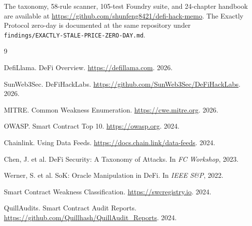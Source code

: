 \documentclass[runningheads]{llncs}
\begin{document}
The taxonomy, 58-rule scanner, 105-test Foundry suite, and 24-chapter handbook are available at \url{https://github.com/shunfeng8421/defi-hack-memo}. The Exactly Protocol zero-day is documented at the same repository under \texttt{findings/EXACTLY-STALE-PRICE-ZERO-DAY.md}.

\begin{thebibliography}{9}

DefiLlama. DeFi Overview. \url{https://defillama.com}. 2026.

SunWeb3Sec. DeFiHackLabs. \url{https://github.com/SunWeb3Sec/DeFiHackLabs}. 2026.

MITRE. Common Weakness Enumeration. \url{https://cwe.mitre.org}. 2026.

OWASP. Smart Contract Top 10. \url{https://owasp.org}. 2024.

Chainlink. Using Data Feeds. \url{https://docs.chain.link/data-feeds}. 2024.

Chen, J. et al. DeFi Security: A Taxonomy of Attacks. In \textit{FC Workshop}, 2023.

Werner, S. et al. SoK: Oracle Manipulation in DeFi. In \textit{IEEE S\&P}, 2022.

Smart Contract Weakness Classification. \url{https://swcregistry.io}. 2024.

QuillAudits. Smart Contract Audit Reports. \url{https://github.com/Quillhash/QuillAudit_Reports}. 2024.

\end{thebibliography}
\end{document}
